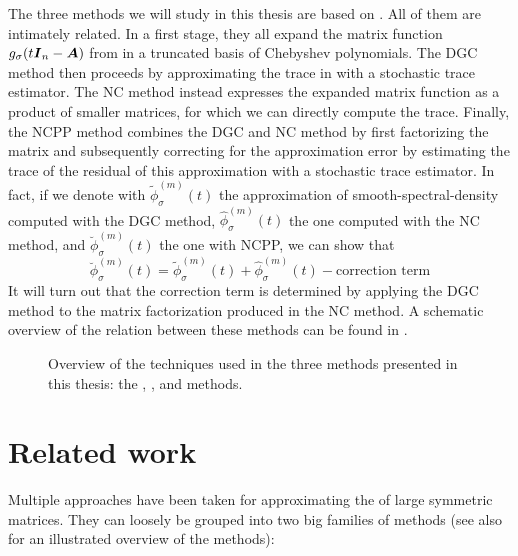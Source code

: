 The three methods we will study in this thesis are based on \cite{lin2017randomized}.
All of them are intimately related. In a first stage, they all expand the matrix
function $g_{\sigma}(t\boldsymbol{I}_n - \boldsymbol{A})$ from
 in a truncated basis of
Chebyshev polynomials. The \gls{DGC} method then proceeds by approximating the
trace in  with a stochastic
trace estimator. The \gls{NC} method instead expresses the expanded matrix function
as a product of smaller matrices, for which we can directly compute the trace.
Finally, the \gls{NCPP} method combines the \gls{DGC} and \gls{NC} method
by first factorizing the matrix and subsequently correcting for the approximation
error by estimating the trace of the residual of this approximation with a stochastic trace estimator.
In fact, if we denote with $\widetilde{\phi}_{\sigma}^{(m)}(t)$ the approximation
of \gls{smooth-spectral-density} computed with the \gls{DGC} method, $\widehat{\phi}_{\sigma}^{(m)}(t)$ the
one computed with the \gls{NC} method, and $\breve{\phi}_{\sigma}^{(m)}(t)$ the one
with \gls{NCPP}, we can show that
\begin{equation}
    \breve{\phi}_{\sigma}^{(m)}(t) = \widetilde{\phi}_{\sigma}^{(m)}(t) + \widehat{\phi}_{\sigma}^{(m)}(t) - \text{correction term}
    \label{equ:1-introduction-relation-methods}
\end{equation}
It will turn out that the correction term is determined by applying
the \gls{DGC} method to the matrix factorization produced in the \gls{NC} method.
A schematic overview of the relation between these methods can be found
in .

\begin{figure}[ht]
    \centering
    
    \caption{Overview of the techniques used in the three methods presented
    in this thesis: the , , and  methods.}
    \label{fig:1-introduction-methods-overview}
\end{figure}


\section{Related work}
\label{sec:1-introduction-related}

Multiple approaches have been taken for approximating the 
of large symmetric matrices. They can loosely be grouped into two big families
of methods (see also  for an
illustrated overview of the methods):

